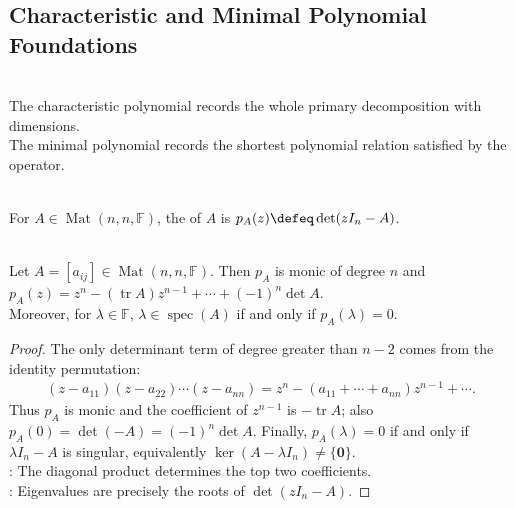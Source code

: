 \subsection{Characteristic and Minimal Polynomial Foundations}

\begin{motivation} \label{mot:characteristic-and-minimal-polynomials} \\
The characteristic polynomial records the whole primary decomposition with dimensions.\\
The minimal polynomial records the shortest polynomial relation satisfied by the operator.
\end{motivation}

\begin{definition} \label{def:matrix-characteristic-polynomial} \\
For $A\in\operatorname{Mat}(n,n,\mathbb{F})$, the  of $A$ is $p_A(z)\defeq\det(zI_n-A)$.
\end{definition}

\begin{theorem} \label{thm:matrix-characteristic-polynomial-basic-coefficients} \\
Let $A=[a_{ij}]\in\operatorname{Mat}(n,n,\mathbb{F})$. Then $p_A$ is monic of degree $n$ and $p_A(z)=z^n-(\operatorname{tr}A)z^{n-1}+\cdots+(-1)^n\det A$.\\
Moreover, for $\lambda\in\mathbb{F}$, $\lambda\in\operatorname{spec}(A)$ if and only if $p_A(\lambda)=0$.
\begin{proof}
The only determinant term of degree greater than $n-2$ comes from the identity permutation:
\begin{align}
(z-a_{11})(z-a_{22})\cdots(z-a_{nn})=z^n-(a_{11}+\cdots+a_{nn})z^{n-1}+\cdots.
\nonumber
\end{align}
Thus $p_A$ is monic and the coefficient of $z^{n-1}$ is $-\operatorname{tr}A$; also $p_A(0)=\det(-A)=(-1)^n\det A$. Finally, $p_A(\lambda)=0$ if and only if $\lambda I_n-A$ is singular, equivalently $\ker(A-\lambda I_n)\neq\{\mathbf{0}\}$.\\
: The diagonal product determines the top two coefficients.\\
: Eigenvalues are precisely the roots of $\det(zI_n-A)$.
\end{proof}
\end{theorem}

